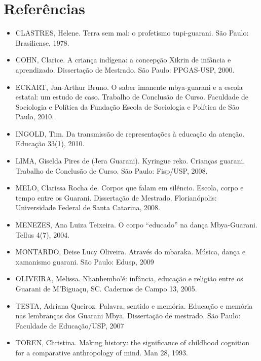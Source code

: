 \section{Referências}

\begin{itemize}
\item CLASTRES, Helene. Terra sem mal: o profetismo tupi-guarani. São
Paulo: Brasiliense, 1978.
\item COHN, Clarice. A criança indígena: a concepção Xikrin de infância
e aprendizado. Dissertação de Mestrado. São Paulo: PPGAS-USP, 2000.
\item ECKART, Jan-Arthur Bruno. O saber imanente mbya-guarani e a escola
estatal: um estudo de caso. Trabalho de Conclusão de Curso. Faculdade
de Sociologia e Política da Fundação Escola de Sociologia e Política de
São Paulo, 2010.
\item INGOLD, Tim. Da transmissão de representações à educação da
atenção. Educação 33(1), 2010.
\item LIMA, Giselda Pires de (Jera Guarani). Kyringue reko. Crianças
guarani. Trabalho de Conclusão de Curso. São Paulo: Fisp/USP, 2008.
\item MELO, Clarissa Rocha de. Corpos que falam em silêncio. Escola,
corpo e tempo entre os Guarani.  Dissertação de Mestrado.
Florianópolis: Universidade Federal de Santa Catarina, 2008.
\item MENEZES, Ana Luiza Teixeira. O corpo ``educado'' na dança
Mbya-Guarani. Tellus 4(7), 2004.
\item MONTARDO, Deise Lucy Oliveira. Através do mbaraka. Música, dança e
xamanismo guarani. São Paulo: Edusp, 2009
\item OLIVEIRA, Melissa.  Nhanhembo’é: infância, educação e religião
entre os Guarani de M’Biguaçu, SC. Cadernos de Campo 13, 2005.
\item TESTA, Adriana Queiroz. Palavra, sentido e memória. Educação e
memória nas lembranças dos Guarani Mbya. Dissertação de mestrado. São
Paulo: Faculdade de Educação/USP, 2007
\item TOREN, Christina. Making history: the significance of childhood
cognition for a comparative anthropology of mind. Man 28, 1993.
\end{itemize}

